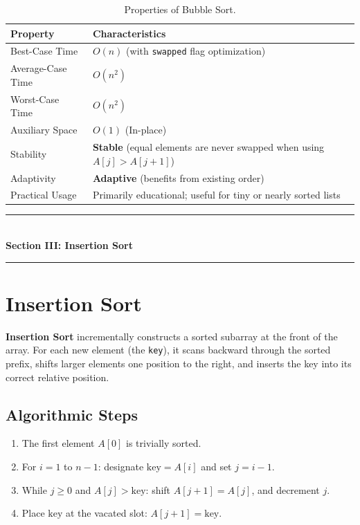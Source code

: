 \begin{table}[htbp]
\centering
\small
\begin{tabularx}{\textwidth}{l X}
\toprule
\textbf{Property} & \textbf{Characteristics} \\
\midrule
Best-Case Time    & $O(n)$ (with \texttt{swapped} flag optimization) \\
Average-Case Time & $O(n^2)$ \\
Worst-Case Time   & $O(n^2)$ \\
Auxiliary Space   & $O(1)$ (In-place) \\
Stability         & \textbf{Stable} (equal elements are never swapped when using $A[j] > A[j+1]$) \\
Adaptivity        & \textbf{Adaptive} (benefits from existing order) \\
Practical Usage   & Primarily educational; useful for tiny or nearly sorted lists \\
\bottomrule
\end{tabularx}
\caption{Properties of Bubble Sort.}
\end{table}

\newpage
\begin{center}
\vspace{0.5em}
{\color{primary}\rule{0.45\textwidth}{1.2pt}}\\[4pt]
{\Large\bfseries\color{primary} Section III: Insertion Sort}\\[2pt]
{\color{primary}\rule{0.45\textwidth}{1.2pt}}
\vspace{0.5em}
\end{center}

\section{Insertion Sort}

\textbf{Insertion Sort} incrementally constructs a sorted subarray at the front of the array. For each new element (the \texttt{key}), it scans backward through the sorted prefix, shifts larger elements one position to the right, and inserts the key into its correct relative position.

\subsection{Algorithmic Steps}
\begin{enumerate}
    \item The first element $A[0]$ is trivially sorted.
    \item For $i = 1$ to $n-1$: designate $\text{key} = A[i]$ and set $j = i - 1$.
    \item While $j \geq 0$ and $A[j] > \text{key}$: shift $A[j+1] = A[j]$, and decrement $j$.
    \item Place $\text{key}$ at the vacated slot: $A[j+1] = \text{key}$.
\end{enumerate}

